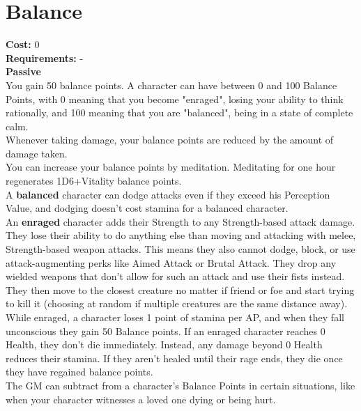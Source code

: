 \section{Balance}
\textbf{Cost:} 0\\
\textbf{Requirements:} -\\
\textbf{Passive}\\
You gain 50 balance points. A character can have between 0 and 100 Balance Points, with 0 meaning that you become "enraged", losing your ability to think rationally, and 100 meaning that you are "balanced", being in a state of complete calm.\\
Whenever taking damage, your balance points are reduced by the amount of damage taken.\\
You can increase your balance points by meditation. Meditating for one hour regenerates 1D6+Vitality balance points.\\
A \textbf{balanced} character can dodge attacks even if they exceed his Perception Value, and dodging doesn't cost stamina for a balanced character.\\
An \textbf{enraged} character adds their Strength to any Strength-based attack damage. They lose their ability to do anything else than moving and attacking with melee, Strength-based weapon attacks. This means they also cannot dodge, block, or use attack-augmenting perks like Aimed Attack or Brutal Attack. They drop any wielded weapons that don't allow for such an attack and use their fists instead. They then move to the closest creature no matter if friend or foe and start trying to kill it (choosing at random if multiple creatures are the same distance away). While enraged, a character loses 1 point of stamina per AP, and when they fall unconscious they gain 50 Balance points. If an enraged character reaches 0 Health, they don't die immediately. Instead, any damage beyond 0 Health reduces their stamina. If they aren't healed until their rage ends, they die once they have regained balance points.\\
The GM can subtract from a character's Balance Points in certain situations, like when your character witnesses a loved one dying or being hurt.